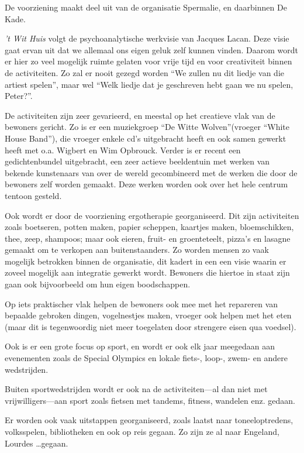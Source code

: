 \documentclass[a4paper,12pt]{article}
\begin{document}
De voorziening maakt deel uit van de organisatie Spermalie, en daarbinnen De Kade.

\emph{’t Wit Huis} volgt de psychoanalytische werkvisie van Jacques Lacan. Deze visie gaat ervan uit dat we allemaal ons eigen geluk zelf kunnen vinden. Daarom wordt er hier zo veel mogelijk ruimte gelaten voor vrije tijd en voor creativiteit binnen de activiteiten. Zo zal er nooit gezegd worden ``We zullen nu dit liedje van die artiest spelen'', maar wel ``Welk liedje dat je geschreven hebt gaan we nu spelen, Peter?''.

De activiteiten zijn zeer gevarieerd, en meestal op het creatieve vlak van de bewoners gericht. Zo is er een muziekgroep ``De Witte Wolven''(vroeger ``White House Band''), die vroeger enkele cd's uitgebracht heeft en ook samen gewerkt heeft met o.a. Wigbert en Wim Opbrouck. Verder is er recent een gedichtenbundel uitgebracht, een zeer actieve beeldentuin met werken van bekende kunstenaars van over de wereld gecombineerd met de werken die door de bewoners zelf worden gemaakt. Deze werken worden ook over het hele centrum tentoon gesteld.

Ook wordt er door de voorziening ergotherapie georganiseerd. Dit zijn activiteiten zoals boetseren, potten maken, papier scheppen, kaartjes maken, bloemschikken, thee, zeep, shampoos; maar ook eieren, fruit- en groenteteelt, pizza's en lasagne gemaakt om te verkopen aan buitenstaanders. Zo worden mensen zo vaak mogelijk betrokken binnen de organisatie, dit kadert in een een visie waarin er zoveel mogelijk aan integratie gewerkt wordt. Bewoners die hiertoe in staat zijn gaan ook bijvoorbeeld om hun eigen boodschappen.

Op iets praktischer vlak helpen de bewoners ook mee met het repareren van bepaalde gebroken dingen, vogelnestjes maken, vroeger ook helpen met het eten (maar dit is tegenwoordig niet meer toegelaten door strengere eisen qua voedsel).

Ook is er een grote focus op sport, en wordt er ook elk jaar meegedaan aan evenementen zoals de Special Olympics en lokale fiets-, loop-, zwem- en andere wedstrijden.

Buiten sportwedstrijden wordt er ook na de activiteiten---al dan niet met vrijwilligers---aan sport zoals fietsen met tandems, fitness, wandelen enz. gedaan.

Er worden ook vaak uitstappen georganiseerd, zoals laatst naar toneeloptredens, volksspelen, bibliotheken en ook op reis gegaan. Zo zijn ze al naar Engeland, Lourdes \dots gegaan.
\end{document}
